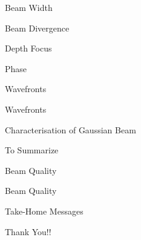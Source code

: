 \documentclass[11pt]{beamer}
\begin{document}
	\begin{frame}{Beam Width}
		
	\end{frame}
	
	\begin{frame}{Beam Divergence}
		
	\end{frame}
	
	\begin{frame}{Depth Focus}
		
	\end{frame}
	
	\begin{frame}{Phase}
		
	\end{frame}
	
	\begin{frame}{Wavefronts}
		
	\end{frame}
	
	\begin{frame}{Wavefronts}
		
	\end{frame}
	
	\begin{frame}{Characterisation of Gaussian Beam}
		
	\end{frame}
	
	\begin{frame}{To Summarize}
		
	\end{frame}
	
	\begin{frame}{Beam Quality}
		
	\end{frame}
	
	\begin{frame}{Beam Quality}
		
	\end{frame}
	
	\begin{frame}{Take-Home Messages}
		
	\end{frame}
	
	\begin{frame}
		\begin{center}
		\LARGE Thank You!!
		\end{center}
	
    \end{frame}
	
	
\end{document}
